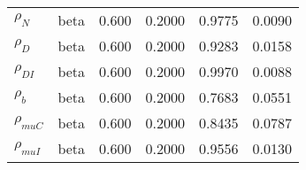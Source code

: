 \begin{center}
\begin{longtable}{llcccc}
${\rho_N}$ & beta &   0.600 & 0.2000 &   0.9775 &  0.0090 \\ 
${\rho_D}$ & beta &   0.600 & 0.2000 &   0.9283 &  0.0158 \\ 
${\rho_{DI}}$ & beta &   0.600 & 0.2000 &   0.9970 &  0.0088 \\ 
${\rho_b}$ & beta &   0.600 & 0.2000 &   0.7683 &  0.0551 \\ 
${\rho_{muC}}$ & beta &   0.600 & 0.2000 &   0.8435 &  0.0787 \\ 
${\rho_{muI}}$ & beta &   0.600 & 0.2000 &   0.9556 &  0.0130 \\ 
\end{longtable}
 \end{center}
